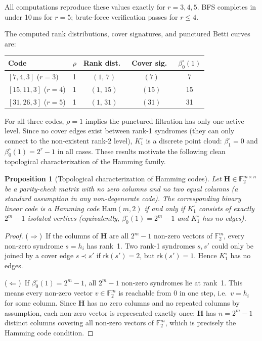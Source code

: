 \documentclass[11pt,twoside,leqno]{article}
\theoremstyle{definition}
\theoremstyle{plain}
\newtheorem{proposition}[definition]{Proposition}
\theoremstyle{remark}
\newcommand{\Ftwo}{\mathbb{F}_2}
\newcommand{\rk}{\mathsf{rk}}
\newcommand{\HH}{\mathbf{H}}
\newcommand{\covrad}{\rho}
\begin{document}
All computations reproduce these values exactly for $r=3,4,5$. BFS completes in under 10\,ms
for $r=5$; brute-force verification passes for $r\le 4$.

The computed rank distributions, cover signatures, and punctured Betti curves are:
\begin{center}
\begin{tabular}{lcccc}
\toprule
Code & $\covrad$ & Rank dist.\ & Cover sig.\ & $\beta_0^\circ(1)$ \\
\midrule
$[7,4,3]$ ($r=3$) & 1 & $(1,\,7)$ & $(7)$ & 7 \\
$[15,11,3]$ ($r=4$) & 1 & $(1,\,15)$ & $(15)$ & 15 \\
$[31,26,3]$ ($r=5$) & 1 & $(1,\,31)$ & $(31)$ & 31 \\
\bottomrule
\end{tabular}
\end{center}
For all three codes, $\covrad=1$ implies the punctured filtration has only one active level.
Since no cover edges exist between rank-1 syndromes (they can only connect to the
non-existent rank-2 level), $K_1^\circ$ is a discrete point cloud: $\beta_1^\circ=0$
and $\beta_0^\circ(1)=2^r-1$ in all cases.
These results motivate the following clean topological characterization of the Hamming family.

\begin{proposition}[Topological characterization of Hamming codes]\label{prop:perfect-char}
Let $\HH\in\Ftwo^{m\times n}$ be a parity-check matrix with no zero columns and no two equal
columns (a standard assumption in any non-degenerate code). The corresponding binary linear
code is a Hamming code $\mathrm{Ham}(m,2)$ if and only if $K_1^\circ$ consists of exactly
$2^m-1$ isolated vertices (equivalently, $\beta_0^\circ(1)=2^m-1$ and $K_1^\circ$ has no edges).
\end{proposition}

\begin{proof}
($\Rightarrow$)\ If the columns of $\HH$ are all $2^m-1$ non-zero vectors of $\Ftwo^m$, every
non-zero syndrome $s=h_i$ has rank~1. Two rank-1 syndromes $s,s'$ could only be joined by a
cover edge $s\prec s'$ if $\rk(s')=2$, but $\rk(s')=1$. Hence $K_1^\circ$ has no edges.

($\Leftarrow$)\ If $\beta_0^\circ(1)=2^m-1$, all $2^m-1$ non-zero syndromes lie at rank~1.
This means every non-zero vector $v\in\Ftwo^m$ is reachable from $0$ in one step, i.e.\ $v=h_i$
for some column. Since $\HH$ has no zero columns and no repeated columns by assumption, each
non-zero vector is represented exactly once: $\HH$ has $n=2^m-1$ distinct columns covering
all non-zero vectors of $\Ftwo^m$, which is precisely the Hamming code condition.
\end{proof}
\end{document}
